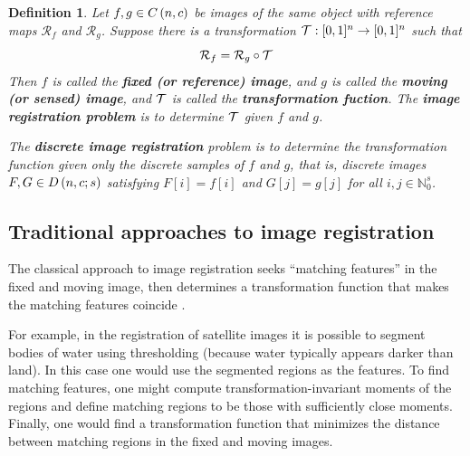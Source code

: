 \documentclass{article}
\newcommand{\Natural}{\mathbb{N}}
\newtheorem{defn}{Definition}
\begin{document}
	\begin{defn}\label{def:image_registration}
		Let \(f,g\in {C\left(n, c\right)}\) be images of the same object with reference maps \(\mathcal{R}_f\) and \(\mathcal{R}_g\). Suppose there is a transformation \(\mathcal{T}:[0,1]^n \to [0,1]^n\) such that
		\begin{equation}\label{eq:reference_equality}
			\mathcal{R}_f = \mathcal{R}_g \circ \mathcal{T}
		\end{equation}
		Then \(f\) is called the \textbf{fixed (or reference) image}, and \(g\) is called the \textbf{moving (or sensed) image}, and \(\mathcal{T}\) is called the \textbf{transformation fuction}. The \textbf{image registration problem} is to determine \(\mathcal{T}\) given \(f\) and \(g\).
		
		The \textbf{discrete image registration} problem is to determine the transformation function given only the discrete samples of \(f\) and \(g\), that is, discrete images \(F, G \in {D\left(n, c; s\right)}\) satisfying \(F[i] = f[i]\) and \(G[j] = g[j]\) for all \(i, j \in \Natural_0^s\).
	\end{defn}
	
	\subsection{Traditional approaches to image registration}
	The classical approach to image registration seeks ``matching features'' in the fixed and moving image, then determines a transformation function that makes the matching features coincide \cite{goshtasby2005}.
	
	For example, in the registration of satellite images it is possible to segment bodies of water using thresholding (because water typically appears darker than land). In this case one would use the segmented regions as the features. To find matching features, one might compute transformation-invariant moments of the regions and define matching regions to be those with sufficiently close moments. Finally, one would find a transformation function that minimizes the distance between matching regions in the fixed and moving images.
	
\end{document}
